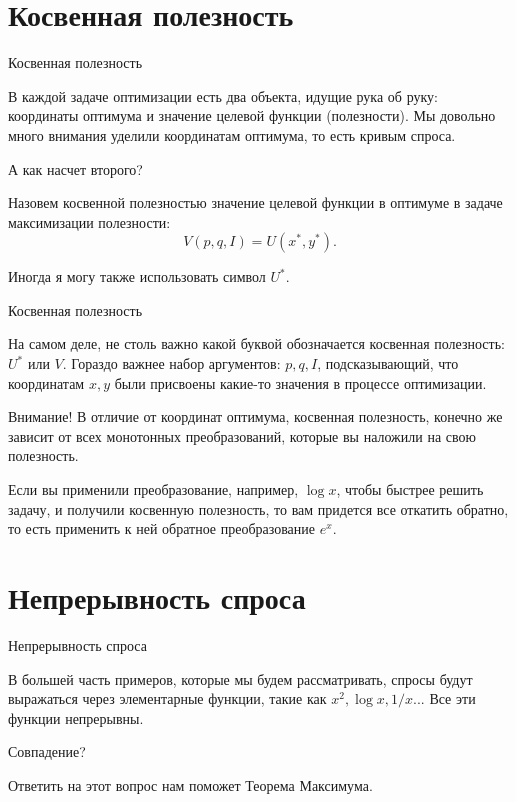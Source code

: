 \documentclass{beamer}
\begin{document}
\section{Косвенная полезность}

\begin{frame}{Косвенная полезность}

В каждой задаче оптимизации есть два объекта, идущие рука об руку: координаты оптимума и значение целевой функции (полезности). Мы довольно много внимания уделили координатам оптимума, то есть кривым спроса. 

А как насчет второго?

\begin{definition}
Назовем \alert{косвенной полезностью} значение целевой функции в оптимуме в задаче максимизации полезности:
$$ V(p,q,I) = U(x^{\ast}, y^{\ast}).$$
\end{definition}
Иногда я могу также использовать символ $U^{\ast}$.

\end{frame}

\begin{frame}{Косвенная полезность}

На самом деле, не столь важно какой буквой обозначается косвенная полезность: $U^{\ast}$ или $V$. Гораздо важнее набор аргументов: $p,q, I$, подсказывающий, что координатам $x,y$ были присвоены какие-то значения в процессе оптимизации.


Внимание! В отличие от координат оптимума, \alert{косвенная полезность, конечно же зависит от всех монотонных преобразований, которые вы наложили} на свою полезность.

Если вы применили преобразование, например, $\log x$, чтобы быстрее решить задачу, и получили косвенную полезность, то вам придется все откатить обратно, то есть применить к ней обратное преобразование $e^x$.

\end{frame}

\section{Непрерывность спроса}

\begin{frame}{Непрерывность спроса}

В большей часть примеров, которые мы будем рассматривать, спросы будут выражаться через элементарные функции, такие как $x^2, \log x, 1/x$... Все эти функции непрерывны. 


Совпадение?

Ответить на этот вопрос нам поможет \alert{Теорема Максимума}.

\end{frame}
\end{document}
